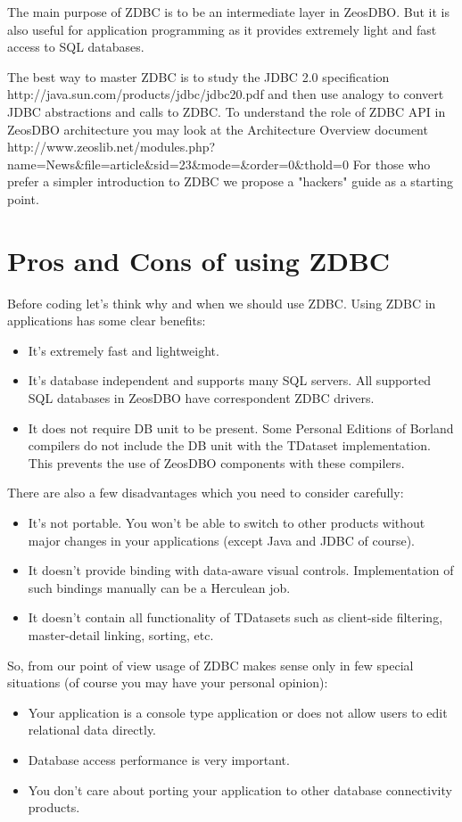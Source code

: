 \documentclass[a4paper,12pt,oneside]{book}
\begin{document}
The main purpose of ZDBC is to be an intermediate layer in ZeosDBO. But it is also useful for application programming as it provides extremely light and fast access to SQL databases.

The best way to master ZDBC is to study the JDBC 2.0 specification http://java.sun.com/products/jdbc/jdbc20.pdf and then use analogy to convert JDBC abstractions and calls to ZDBC. To understand the role of ZDBC API in ZeosDBO architecture you may look at the Architecture Overview document http://www.zeoslib.net/modules.php?name=News\&file=article\&sid=23\&mode=\&order=0\&thold=0 For those who prefer a simpler introduction to ZDBC we propose a "hackers" guide as a starting point. 

\section{Pros and Cons of using ZDBC}
Before coding let's think why and when we should use ZDBC. Using ZDBC in applications has some clear benefits:
\begin{itemize}
  \item It's extremely fast and lightweight.
  \item It's database independent and supports many SQL servers. All supported SQL databases in ZeosDBO have correspondent ZDBC drivers.
  \item It does not require DB unit to be present. Some Personal Editions of Borland compilers do not include the DB unit with the TDataset implementation. This prevents the use of ZeosDBO components with these compilers.
\end{itemize}

There are also a few disadvantages which you need to consider carefully: 
\begin{itemize}
  \item It's not portable. You won’t be able to switch to other products without major changes in your applications (except Java and JDBC of course).
  \item It doesn't provide binding with data-aware visual controls. Implementation of such bindings manually can be a Herculean job.
  \item It doesn't contain all functionality of TDatasets such as client-side filtering, master-detail linking, sorting, etc.
\end{itemize}

So, from our point of view usage of ZDBC makes sense only in few special situations (of course you may have your personal opinion):
\begin{itemize}
  \item Your application is a console type application or does not allow users to edit relational data directly.
  \item Database access performance is very important.
  \item You don't care about porting your application to other database connectivity products.
\end{itemize}
\end{document}
